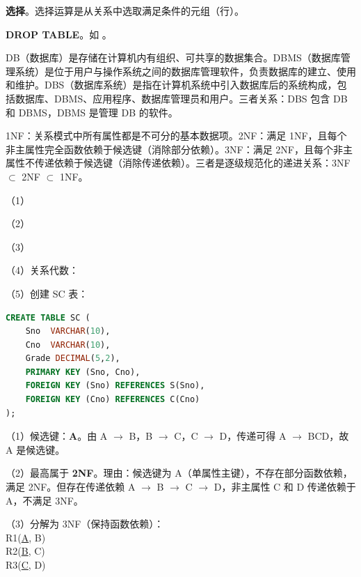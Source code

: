 \documentclass[a4paper,11pt]{article}
\begin{document}
\q \textbf{选择}。选择运算是从关系中选取满足条件的元组（行）。

\q \textbf{DROP TABLE}。如 。


\q DB（数据库）是存储在计算机内有组织、可共享的数据集合。DBMS（数据库管理系统）是位于用户与操作系统之间的数据库管理软件，负责数据库的建立、使用和维护。DBS（数据库系统）是指在计算机系统中引入数据库后的系统构成，包括数据库、DBMS、应用程序、数据库管理员和用户。三者关系：DBS 包含 DB 和 DBMS，DBMS 是管理 DB 的软件。

\q 1NF：关系模式中所有属性都是不可分的基本数据项。2NF：满足 1NF，且每个非主属性完全函数依赖于候选键（消除部分依赖）。3NF：满足 2NF，且每个非主属性不传递依赖于候选键（消除传递依赖）。三者是逐级规范化的递进关系：3NF $\subset$ 2NF $\subset$ 1NF。


\q （1）

\q （2）

\q （3）

\q （4）关系代数：

\q （5）创建 SC 表：
\begin{lstlisting}[language=SQL]
CREATE TABLE SC (
    Sno  VARCHAR(10),
    Cno  VARCHAR(10),
    Grade DECIMAL(5,2),
    PRIMARY KEY (Sno, Cno),
    FOREIGN KEY (Sno) REFERENCES S(Sno),
    FOREIGN KEY (Cno) REFERENCES C(Cno)
);
\end{lstlisting}


\q （1）候选键：\textbf{A}。由 A $\rightarrow$ B，B $\rightarrow$ C，C $\rightarrow$ D，传递可得 A $\rightarrow$ BCD，故 A 是候选键。

\par（2）最高属于 \textbf{2NF}。理由：候选键为 A（单属性主键），不存在部分函数依赖，满足 2NF。但存在传递依赖 A $\rightarrow$ B $\rightarrow$ C $\rightarrow$ D，非主属性 C 和 D 传递依赖于 A，不满足 3NF。

\par（3）分解为 3NF（保持函数依赖）：\\
R1(\underline{A}, B)\\
R2(\underline{B}, C)\\
R3(\underline{C}, D)
\end{document}
